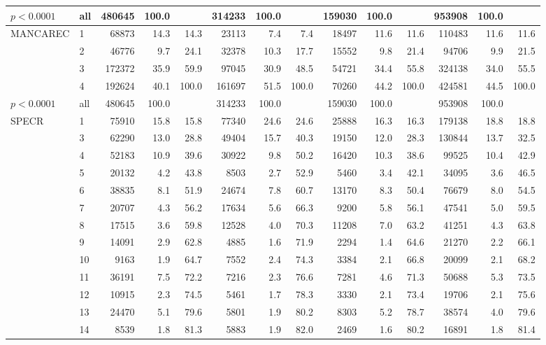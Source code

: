 \begin{table}[ht]
{\begin{tabular}{ll|rrr|rrr|rrr|rrr}
   \hline
$p< 0.0001$ & all & 480645 & 100.0 &  & 314233 & 100.0 &  & 159030 & 100.0 &  & 953908 & 100.0 &  \\ 
   \hline
\hline
MANCAREC & 1 & 68873 & 14.3 & 14.3 & 23113 & 7.4 & 7.4 & 18497 & 11.6 & 11.6 & 110483 & 11.6 & 11.6 \\ 
   & 2 & 46776 & 9.7 & 24.1 & 32378 & 10.3 & 17.7 & 15552 & 9.8 & 21.4 & 94706 & 9.9 & 21.5 \\ 
   & 3 & 172372 & 35.9 & 59.9 & 97045 & 30.9 & 48.5 & 54721 & 34.4 & 55.8 & 324138 & 34.0 & 55.5 \\ 
   & 4 & 192624 & 40.1 & 100.0 & 161697 & 51.5 & 100.0 & 70260 & 44.2 & 100.0 & 424581 & 44.5 & 100.0 \\ 
   \hline
$p< 0.0001$ & all & 480645 & 100.0 &  & 314233 & 100.0 &  & 159030 & 100.0 &  & 953908 & 100.0 &  \\ 
   \hline
\hline
SPECR & 1 & 75910 & 15.8 & 15.8 & 77340 & 24.6 & 24.6 & 25888 & 16.3 & 16.3 & 179138 & 18.8 & 18.8 \\ 
   & 3 & 62290 & 13.0 & 28.8 & 49404 & 15.7 & 40.3 & 19150 & 12.0 & 28.3 & 130844 & 13.7 & 32.5 \\ 
   & 4 & 52183 & 10.9 & 39.6 & 30922 & 9.8 & 50.2 & 16420 & 10.3 & 38.6 & 99525 & 10.4 & 42.9 \\ 
   & 5 & 20132 & 4.2 & 43.8 & 8503 & 2.7 & 52.9 & 5460 & 3.4 & 42.1 & 34095 & 3.6 & 46.5 \\ 
   & 6 & 38835 & 8.1 & 51.9 & 24674 & 7.8 & 60.7 & 13170 & 8.3 & 50.4 & 76679 & 8.0 & 54.5 \\ 
   & 7 & 20707 & 4.3 & 56.2 & 17634 & 5.6 & 66.3 & 9200 & 5.8 & 56.1 & 47541 & 5.0 & 59.5 \\ 
   & 8 & 17515 & 3.6 & 59.8 & 12528 & 4.0 & 70.3 & 11208 & 7.0 & 63.2 & 41251 & 4.3 & 63.8 \\ 
   & 9 & 14091 & 2.9 & 62.8 & 4885 & 1.6 & 71.9 & 2294 & 1.4 & 64.6 & 21270 & 2.2 & 66.1 \\ 
   & 10 & 9163 & 1.9 & 64.7 & 7552 & 2.4 & 74.3 & 3384 & 2.1 & 66.8 & 20099 & 2.1 & 68.2 \\ 
   & 11 & 36191 & 7.5 & 72.2 & 7216 & 2.3 & 76.6 & 7281 & 4.6 & 71.3 & 50688 & 5.3 & 73.5 \\ 
   & 12 & 10915 & 2.3 & 74.5 & 5461 & 1.7 & 78.3 & 3330 & 2.1 & 73.4 & 19706 & 2.1 & 75.6 \\ 
   & 13 & 24470 & 5.1 & 79.6 & 5801 & 1.9 & 80.2 & 8303 & 5.2 & 78.7 & 38574 & 4.0 & 79.6 \\ 
   & 14 & 8539 & 1.8 & 81.3 & 5883 & 1.9 & 82.0 & 2469 & 1.6 & 80.2 & 16891 & 1.8 & 81.4 \\ 

\end{tabular}}
\end{table}
